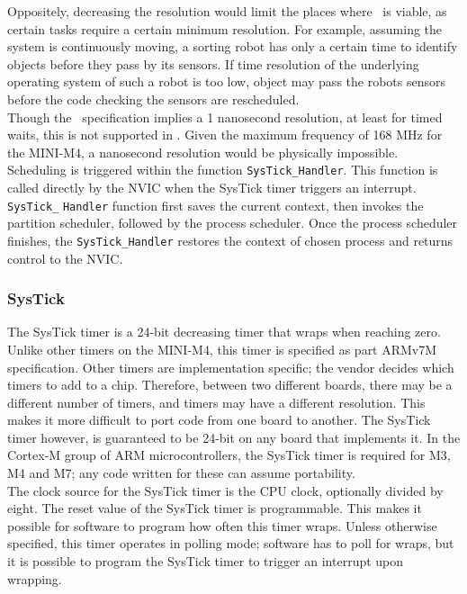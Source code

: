 Oppositely, decreasing the resolution would limit the places where \OSname\ is
viable, as certain tasks require a certain minimum resolution. For example,
assuming the system is continuously moving, a sorting robot has only a certain
time to identify objects before they pass by its sensors. If time resolution of
the underlying operating system of such a robot is too low, object may pass the
robots sensors before the code checking the sensors are rescheduled.\\

Though the \arinc\ specification implies a 1 nanosecond resolution, at least for
timed waits, this is not supported in \OSname . Given the maximum frequency of
168 MHz for the MINI-M4, a nanosecond resolution would be physically impossible.\\

Scheduling is triggered within the function \texttt{SysTick\_Handler}. This
function is called directly by the NVIC when the SysTick timer triggers an
interrupt. \texttt{SysTick\_} \texttt{Handler} function first saves the current
context, then invokes the partition scheduler, followed by the process scheduler.
Once the process scheduler finishes, the \texttt{SysTick\_}\texttt{Handler}
restores the context of chosen process and returns control to the NVIC.

\subsubsection{SysTick}
The SysTick timer is a 24-bit decreasing timer that wraps when reaching zero.
Unlike other timers on the MINI-M4, this timer is specified as part ARMv7M
specification. Other timers are implementation specific; the vendor decides
which timers to add to a chip. Therefore, between two different boards, there
may be a different number of timers, and timers may have a different resolution.
This makes it more difficult to port code from one board to another. The SysTick
timer however, is guaranteed to be 24-bit on any board that implements it. In the
Cortex-M group of ARM microcontrollers, the SysTick timer is required for M3, M4
and M7; any code written for these can assume portability.\\

The clock source for the SysTick timer is the CPU clock, optionally divided by
eight. The reset value of the SysTick timer is programmable. This makes it
possible for software to program how often this timer wraps.
Unless otherwise specified, this timer operates in polling mode; software has to
poll for wraps, but it is possible to program the SysTick timer to trigger an
interrupt upon wrapping.

